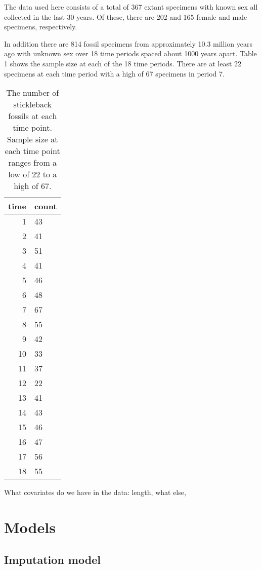 \documentclass[
  12pt,
]{article}
\begin{document}
The data used here consists of a total of 367 extant specimens with
known sex all collected in the last 30 years. Of these, there are 202
and 165 female and male specimens, respectively.

In addition there are 814 fossil specimens from approximately 10.3
million years ago with unknown sex over 18 time periods spaced about
1000 years apart. Table 1 shows the sample size at each of the 18 time
periods. There are at least 22 specimens at each time period with a high
of 67 specimens in period 7.

\begin{table}[ht]
\centering
\begin{tabular}{rl}
  \hline
time & count \\ 
  \hline
  1 & 43 \\ 
    2 & 41 \\ 
    3 & 51 \\ 
    4 & 41 \\ 
    5 & 46 \\ 
    6 & 48 \\ 
    7 & 67 \\ 
    8 & 55 \\ 
    9 & 42 \\ 
   10 & 33 \\ 
   11 & 37 \\ 
   12 & 22 \\ 
   13 & 41 \\ 
   14 & 43 \\ 
   15 & 46 \\ 
   16 & 47 \\ 
   17 & 56 \\ 
   18 & 55 \\ 
   \hline
\end{tabular}
\label{tab1}
\caption{The number of stickleback fossils at each time point.  Sample size at each time point ranges from a low of 22 to a high of 67.}
\end{table}

What covariates do we have in the data: length, what else,

\hypertarget{sec:models}{%
\section{Models}\label{sec:models}}

\hypertarget{imputation-model}{%
\subsection{Imputation model}\label{imputation-model}}
\end{document}
